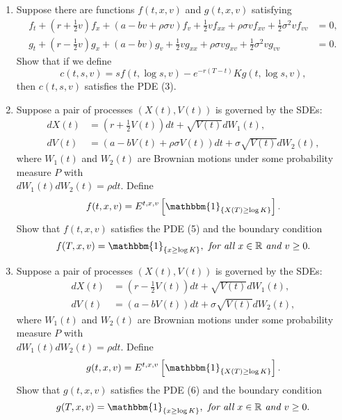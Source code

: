\documentclass[11pt,a4,table]{article}
\begin{document}
\begin{enumerate}
\begin{enumerate}
        \item  Suppose there are functions $f(t,x,v)$ and $g(t,x,v)$ satisfying
        \begin{align}
            f_t + \left(r + \frac{1}{2}v\right) f_x + (a - bv + \rho \sigma v) f_v + \frac{1}{2}vf_{xx} + \rho\sigma v f_{xv} + \frac{1}{2}\sigma^2 v f_{vv} &= 0,\\
            g_t + \left(r - \frac{1}{2}v\right) g_x + (a - bv) g_v + \frac{1}{2}vg_{xx} + \rho \sigma v g_{xv} + \frac{1}{2}\sigma^2 vg_{vv} &=0.
        \end{align}
        Show that if we define
        \begin{equation}
            c(t,s,v) = sf(t,\log s, v) - e^{-r(T-t)}Kg(t,\log s, v),
        \end{equation}
        then $c(t,s,v)$ satisfies the PDE (3).
        \newpage
        
        \item Suppose a pair of processes $(X(t), V(t))$ is governed by the SDEs:
        \begin{align}
            dX(t) &= \left(r + \frac{1}{2}V(t) \right) dt + \sqrt{V(t)} dW_1(t),\\
            dV(t) &= (a - bV(t) + \rho \sigma V(t)) dt + \sigma\sqrt{V(t)} dW_2(t),
        \end{align}
        where $W_1(t)$ and $W_2(t)$ are Brownian motions under some probability measure $P$ with \\$dW_1(t)dW_2(t) = \rho dt$. Define
        \begin{equation*}
            f(t,x,v)=E^{t,x,v}\left[\mathbbm{1}_{\{X(T)\geq \log K\}}\right].
        \end{equation*}
        Show that $f(t,x,v)$ satisfies the PDE (5) and the boundary condition
        \begin{equation*}
            f(T,x,v) = \mathbbm{1}_{\{x\geq\log K\}}, \textit{ for all } x\in \mathbb{R} \textit{ and } v\geq 0.
        \end{equation*}
        
        \item Suppose a pair of processes $(X(t), V(t))$ is governed by the SDEs:
        \begin{align}
            dX(t) &= \left( r - \frac{1}{2}V(t) \right) dt + \sqrt{V(t)} dW_1(t),\\
            dV(t) &= (a - bV(t)) dt + \sigma\sqrt{V(t)} dW_2(t),
        \end{align}
        where $W_1(t)$ and $W_2(t)$ are Brownian motions under some probability measure $P$ with \\$dW_1(t) dW_2(t) = \rho dt$. Define
        \begin{equation*}
            g(t,x,v) = E^{t,x,v}\left[\mathbbm{1}_{\{X(T)\geq\log K\}}\right].
        \end{equation*}
        Show that $g(t,x,v)$ satisfies the PDE (6) and the boundary condition
        \begin{equation*}
            g(T,x,v) = \mathbbm{1}_{\{x\geq \log K\}}, \textit{ for all } x\in\mathbb{R} \textit{ and } v\geq 0.
        \end{equation*}
        

\end{enumerate}
\end{enumerate}
\end{document}
